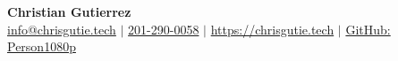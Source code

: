 \documentclass{article}
\begin{document}
\begin{center}
\thispagestyle{empty}
\large \textbf{Christian Gutierrez \\}
\normalsize \href{mailto:info@chrisgutie.tech}{info@chrisgutie.tech} $\mid$ \href{tel:2012900058}{201-290-0058} $\mid$ \href{https://chrisgutie.tech}{https://chrisgutie.tech}
 $\mid$ \href{https://github.com/Person1080p}{GitHub: Person1080p}    \\
\hrulefill
\end{center}







\end{document}
